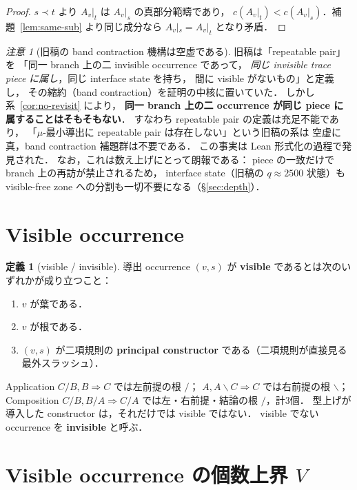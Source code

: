 \documentclass[paper=a4,fontsize=10pt,jafontscale=0.92]{jlreq}
\theoremstyle{plain}
\theoremstyle{definition}
\newtheorem{definition}[theorem]{定義}
\theoremstyle{remark}
\newtheorem*{remark}{注意}
\newcommand{\bs}{\backslash}
\begin{document}
\begin{proof}
$s \prec t$ より $A_v|_t$ は $A_v|_s$ の真部分範疇であり，
$c(A_v|_t) < c(A_v|_s)$．補題~\ref{lem:same-sub} より同じ成分なら
$A_v|_s = A_v|_t$ となり矛盾．
\end{proof}

\begin{remark}[旧稿の band contraction 機構は空虚である]
旧稿は「repeatable pair」を
「同一 branch 上の二 invisible occurrence であって，
\emph{同じ invisible trace piece に属し}，同じ interface state を持ち，
間に visible がないもの」と定義し，
その縮約（band contraction）を証明の中核に置いていた．
しかし系~\ref{cor:no-revisit} により，
\textbf{同一 branch 上の二 occurrence が同じ piece に属することはそもそもない}．
すなわち repeatable pair の定義は充足不能であり，
「$\mu$-最小導出に repeatable pair は存在しない」という旧稿の系は
空虚に真，band contraction 補題群は不要である．
この事実は Lean 形式化の過程で発見された．
なお，これは数え上げにとって朗報である：
piece の一致だけで branch 上の再訪が禁止されるため，
interface state（旧稿の $q\approx 2500$ 状態）も
visible-free zone への分割も一切不要になる（\S\ref{sec:depth}）．
\end{remark}

\section{Visible occurrence}
\label{sec:visible}

\begin{definition}[visible / invisible]
導出 occurrence $(v,s)$ が \textbf{visible} であるとは次のいずれかが成り立つこと：
\begin{enumerate}
  \item $v$ が葉である．
  \item $v$ が根である．
  \item $(v,s)$ が二項規則の \textbf{principal constructor} である（二項規則が直接見る最外スラッシュ）．
\end{enumerate}
Application $C/B,B\Rightarrow C$ では左前提の根 $/$；
$A,A\bs C\Rightarrow C$ では右前提の根 $\bs$；
Composition $C/B,B/A\Rightarrow C/A$ では左・右前提・結論の根 $/$，計3個．
型上げが導入した constructor は，それだけでは visible ではない．
visible でない occurrence を \textbf{invisible} と呼ぶ．
\end{definition}

\section{Visible occurrence の個数上界 $V$}
\label{sec:V}
\end{document}
